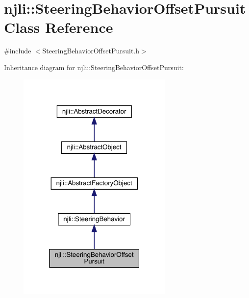 \hypertarget{classnjli_1_1_steering_behavior_offset_pursuit}{}\section{njli\+:\+:Steering\+Behavior\+Offset\+Pursuit Class Reference}
\label{classnjli_1_1_steering_behavior_offset_pursuit}


{\ttfamily \#include $<$Steering\+Behavior\+Offset\+Pursuit.\+h$>$}



Inheritance diagram for njli\+:\+:Steering\+Behavior\+Offset\+Pursuit\+:\nopagebreak
\begin{figure}[H]
\begin{center}
\leavevmode
\includegraphics[width=217pt]{classnjli_1_1_steering_behavior_offset_pursuit__inherit__graph}
\end{center}
\end{figure}


